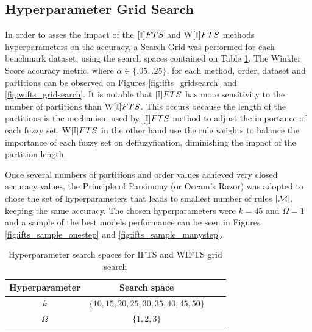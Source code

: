 \subsection{Hyperparameter Grid Search}
\label{sec:prob_hyperparameters}

In order to asses the impact of the $[\mathbb{I}]FTS$ and W$[\mathbb{I}]FTS$ methods hyperparameters on the accuracy, a Search Grid was performed for each benchmark dataset, using the search spaces contained on Table \ref{tab:ifts_gridsearch}. The Winkler Score accuracy metric, where  $\alpha \in \{.05,.25\}$, for each method, order, dataset and partitions can be observed on Figures \ref{fig:ifts_gridsearch} and \ref{fig:wifts_gridsearch}. It is notable that $[\mathbb{I}]FTS$ has more sensitivity to the number of partitions than W$[\mathbb{I}]FTS$. This occurs because the length of the partitions is the mechanism used by $[\mathbb{I}]FTS$ method to adjust the importance of each fuzzy set. W$[\mathbb{I}]FTS$ in the other hand use the rule weights to balance the importance of each fuzzy set on deffuzyfication, diminishing the impact of the partition length.   

Once several numbers of partitions and order values achieved very closed accuracy values, the Principle of Parsimony (or Occam's Razor) was adopted to chose the set of hyperparameters that leads to smallest number of rules $|\mathcal{M}|$, keeping the same accuracy. The chosen hyperparameters were $k = 45$ and $\Omega = 1$ and a sample of the best models performance can be seen in Figures \ref{fig:ifts_sample_onestep} and \ref{fig:ifts_sample_manystep}.

\begin{table}[htb]
    \centering
    \begin{tabular}{|c|c|c|c|} \hline
        Hyperparameter & Search space  \\ \hline
        $k$ & $\{10, 15, 20, 25, 30, 35, 40, 45, 50\}$  \\ \hline
        $\Omega$ & $\{1, 2, 3\}$ \\ \hline
    \end{tabular}
    \caption{Hyperparameter search spaces for IFTS and WIFTS grid search}
    \label{tab:ifts_gridsearch}
\end{table}

